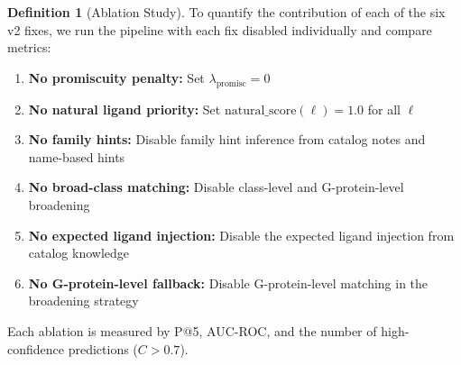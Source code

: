 \documentclass[12pt,oneside]{article}
\theoremstyle{definition}
\newtheorem{definition}{Definition}[section]
\begin{document}
\begin{definition}[Ablation Study]
To quantify the contribution of each of the six v2 fixes, we run the pipeline with each fix disabled individually and compare metrics:
\begin{enumerate}[label=(F\arabic*)]
\item \textbf{No promiscuity penalty:} Set $\lambda_{\text{promisc}} = 0$
\item \textbf{No natural ligand priority:} Set $\text{natural\_score}(\ell) = 1.0$ for all $\ell$
\item \textbf{No family hints:} Disable family hint inference from catalog notes and name-based hints
\item \textbf{No broad-class matching:} Disable class-level and G-protein-level broadening
\item \textbf{No expected ligand injection:} Disable the expected ligand injection from catalog knowledge
\item \textbf{No G-protein-level fallback:} Disable G-protein-level matching in the broadening strategy
\end{enumerate}
Each ablation is measured by P@5, AUC-ROC, and the number of high-confidence predictions ($C > 0.7$).
\end{definition}
\end{document}
